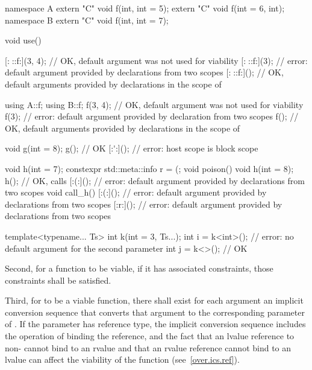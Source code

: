 \begin{example}
\begin{codeblock}
namespace A {
  extern "C" void f(int, int = 5);
  extern "C" void f(int = 6, int);
}
namespace B {
  extern "C" void f(int, int = 7);
}

void use() {
  [:^^A::f:](3, 4);     // OK, default argument was not used for viability
  [:^^A::f:](3);        // error: default argument provided by declarations from two scopes
  [:^^A::f:]();         // OK, default arguments provided by declarations in the scope of 

  using A::f;
  using B::f;
  f(3, 4);              // OK, default argument was not used for viability
  f(3);                 // error: default argument provided by declaration from two scopes
  f();                  // OK, default arguments provided by declarations in the scope of 

  void g(int = 8);
  g();                  // OK
  [:^^g:]();            // error: host scope is block scope
}

void h(int = 7);
constexpr std::meta::info r = ^^h;
void poison() {
  void h(int = 8);
  h();                  // OK, calls 
  [:^^h:]();            // error: default argument provided by declarations from two scopes
}
void call_h() {
  [:^^h:]();            // error: default argument provided by declarations from two scopes
  [:r:]();              // error: default argument provided by declarations from two scopes
}

template<typename... Ts>
int k(int = 3, Ts...);
int i = k<int>();       // error: no default argument for the second parameter
int j = k<>();          // OK
\end{codeblock}
\end{example}

\pnum
Second, for a function to be viable, if it has associated constraints,
those constraints shall be satisfied.

\pnum
Third, for
to be a viable function, there shall exist for each
argument an
implicit conversion sequence that
converts that argument to the corresponding parameter of
.
If the parameter has reference type, the implicit conversion sequence
includes the operation of binding the reference, and the fact that
an lvalue reference to non- cannot bind to an rvalue
and that an rvalue reference cannot bind to an lvalue
can affect
the viability of the function (see~\ref{over.ics.ref}).

